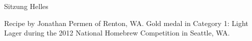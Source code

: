 \begin{recipe}{Sitzung Helles}

\begin{aboutblock}
Recipe by Jonathan Permen of Renton, WA. Gold medal in Category 1: Light Lager
during the 2012 National Homebrew Competition in Seattle, WA.
\sourceaha
\end{aboutblock}


\begin{methodandtiming}

\begin{mashsteps}
\end{mashsteps}

\begin{fermentationsteps}
\end{fermentationsteps}

\end{methodandtiming}

\recipebreak

\begin{ingredientsblock}

\begin{malts}
\end{malts}

\begin{hops}
\end{hops}


\end{ingredientsblock}

\end{recipe}

